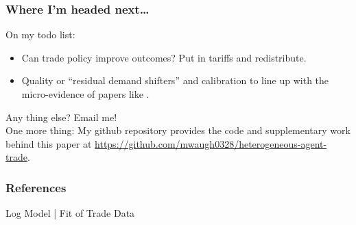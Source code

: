\documentclass[9pt,pdftex,aspectratio=1610]{beamer}
\theoremstyle{definition}
\begin{document}

\begin{frame}[t]
\frametitle{Where I'm headed next\ldots}
\smallskip
On my todo list:
\begin{itemize}
\smallskip
\item Can trade policy improve outcomes? Put in tariffs and redistribute.
\smallskip
\item Quality or ``residual demand shifters'' and calibration to line up with the micro-evidence of papers like \citet{auer2022unequal}.
\end{itemize}
\medskip
Any thing else? Email me!\\
\bigskip
One more thing: My github repository provides the code and supplementary work behind this paper at \url{https://github.com/mwaugh0328/heterogeneous-agent-trade}.

\end{frame}



\appendix

\setcounter{finalframe}{\value{framenumber}}

\begin{frame}[allowframebreaks]
\frametitle{References}
\scriptsize

\end{frame}


\begin{frame}[t]{Log Model | Fit of Trade Data}
\begin{figure}[!t]
\end{figure}
\end{frame}
\end{document}
